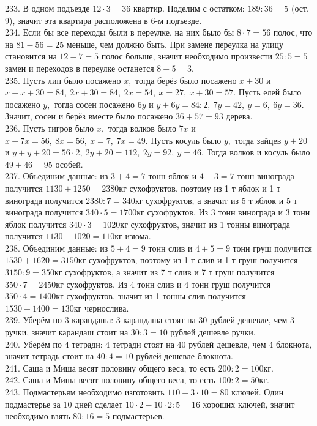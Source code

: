 233. В одном подъезде $12\cdot3=36$ квартир. Поделим с остатком: $189:36=5$ (ост. 9), значит эта квартира расположена в 6-м  подъезде.\\
234. Если бы все переходы были в переулке, на них было бы $8\cdot7=56$ полос, что на $81-56=25$ меньше, чем должно быть. При замене переулка на улицу становится на $12-7=5$ полос больше, значит необходимо произвести $25:5=5$ замен и переходов в переулке останется $8-5=3.$\\
235. Пусть лип было посажено $x,$ тогда берёз было посажено $x+30$ и $x+x+30=84,\ 2x+30=84,\ 2x=54,\ x=27,\ x+30=57.$ Пусть елей было посажено $y,$ тогда сосен посажено $6y$ и $y+6y=84:2,\ 7y=42,\ y=6,\ 6y=36.$ Значит, сосен и берёз вместе было посажено $36+57=93$ дерева.\\
236. Пусть тигров было $x,$ тогда волков было $7x$ и $x+7x=56,\ 8x=56,\ x=7,\ 7x=49.$ Пусть косуль было $y,$ тогда зайцев $y+20$ и $y+y+20=56\cdot2,\ 2y+20=112,\ 2y=92,\ y=46.$ Тогда волков и косуль было $49+46=95$ особей.\\
237. Объединим данные: из $3+4=7$ тонн яблок и $4+3=7$ тонн винограда получится $1130+1250=2380$кг сухофруктов, поэтому из 1 т яблок и 1 т винограда получится $2380:7=340$кг сухофруктов, а значит из 5 т яблок и 5 т винограда получится $340\cdot5=1700$кг сухофруктов. Из 3 тонн винограда и 3 тонн яблок получится $340\cdot3=1020$кг сухофруктов, значит из 1 тонны винограда получится $1130-1020=110$кг изюма.\\
238. Объединим данные: из $5+4=9$ тонн слив и $4+5=9$ тонн груш получится $1530+1620=3150$кг сухофруктов, поэтому из 1 т слив и 1 т груш получится $3150:9=350$кг сухофруктов, а значит из 7 т слив и 7 т груш получится $350\cdot7=2450$кг сухофруктов. Из 4 тонн слив и 4 тонн груш получится $350\cdot4=1400$кг сухофруктов, значит из 1 тонны слив получится $1530-1400=130$кг чернослива.\\
239. Уберём по 3 карандаша: 3 карандаша стоят на 30 рублей дешевле, чем 3 ручки, значит карандаш стоит на $30:3=10$ рублей дешевле ручки.\\
240. Уберём по 4 тетради: 4 тетради стоят на 40 рублей дешевле, чем 4 блокнота, значит тетрадь стоит на $40:4=10$ рублей дешевле блокнота.\\
241. Саша и Миша весят половину общего веса, то есть $200:2=100$кг.\\
242. Саша и Миша весят половину общего веса, то есть $100:2=50$кг.\\
243. Подмастерьям необходимо изготовить $110-3\cdot10=80$ ключей. Один подмастерье за 10 дней сделает $10\cdot2-10\cdot2:5=16$ хороших ключей, значит необходимо взять $80:16=5$ подмастерьев.\\
